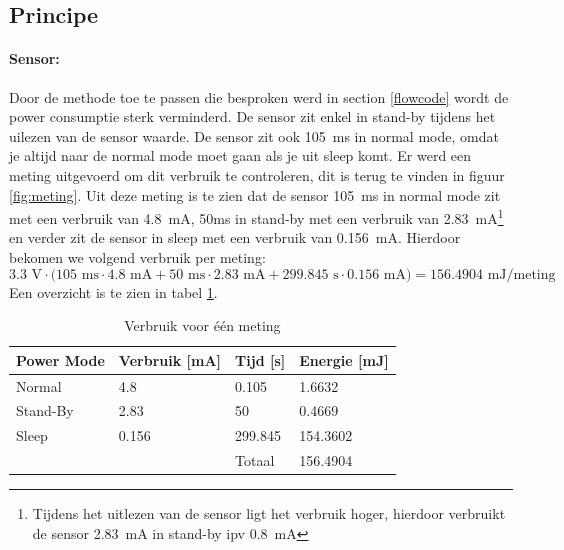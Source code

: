 \documentclass[]{article}
\begin{document}
\subsection{Principe}
\paragraph{Sensor: }
Door de methode toe te passen die besproken werd in section \ref{flowcode} wordt de power consumptie sterk verminderd. De sensor zit enkel in stand-by tijdens het uilezen van de sensor waarde. De sensor zit ook 105~ms in normal mode, omdat je altijd naar de normal mode moet gaan als je uit sleep komt. Er werd een meting uitgevoerd om dit verbruik te controleren, dit is terug te vinden in figuur \ref{fig:meting}. Uit deze meting is te zien dat de sensor 105~ms in normal mode zit met een verbruik van 4.8~mA, 50ms in stand-by met een verbruik van 2.83~mA\footnote{Tijdens het uitlezen van de sensor ligt het verbruik hoger, hierdoor verbruikt de sensor 2.83~mA in stand-by ipv 0.8~mA} en verder zit de sensor in sleep met een verbruik van 0.156~mA. Hierdoor bekomen we volgend verbruik per meting:
\begin{equation}
	 3.3\text{ V}\cdot\big(105\text{ ms} \cdot 4.8 \text{ mA} + 50\text{ ms}\cdot 2.83\text{ mA}+299.845\text{ s}\cdot 0.156\text{ mA}\big) = 156.4904 \text{ mJ/meting}
\end{equation}
Een overzicht is te zien in tabel \ref{tab:verbruik}.


\begin{table}[h!]
	\centering
	\begin{tabular}{@{}llll@{}}
	\toprule
	Power Mode & Verbruik {[}mA{]} & Tijd {[}s{]} & Energie {[}mJ{]} \\ \midrule
	Normal     & 4.8               & 0.105        & 1.6632           \\
	Stand-By   & 2.83              & 50           & 0.4669           \\
	Sleep      & 0.156             & 299.845      & 154.3602         \\
			   &                   & Totaal       & 156.4904         \\ \bottomrule
	\end{tabular}%
	\caption{Verbruik voor \'e\'en meting}
	\label{tab:verbruik}
	\end{table}
\end{document}

